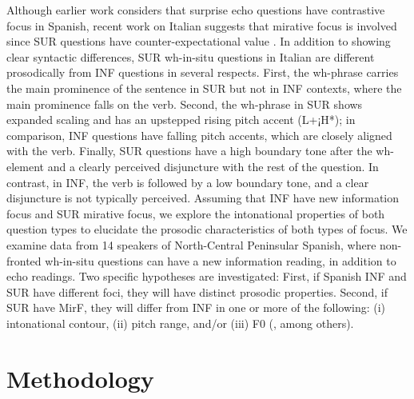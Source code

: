 \documentclass[output=paper,colorlinks,citecolor=brown,draftmode]{langscibook}
\begin{document}
\largerpage
Although earlier work considers that surprise echo questions have contrastive focus in Spanish, recent work on Italian suggests that mirative focus is involved since SUR questions have counter-expectational value \citep{BadanCrocco2019}. In addition to showing clear syntactic differences, SUR wh-in-situ questions in Italian are different prosodically from INF questions in several respects. First, the wh-phrase carries the main prominence of the sentence in SUR but not in INF contexts, where the main prominence falls on the verb. Second, the wh-phrase in SUR shows expanded scaling and has an upstepped rising pitch accent (L+¡H*); in comparison, INF questions have falling pitch accents, which are closely aligned with the verb. Finally, SUR questions have a high boundary tone after the wh-element and a clearly perceived disjuncture with the rest of the question. In contrast, in INF, the verb is followed by a low boundary tone, and a clear disjuncture is not typically perceived.
Assuming that INF have new information focus and SUR mirative focus, we explore the intonational properties of both question types to elucidate the prosodic characteristics of both types of focus. We examine data from 14 speakers of North-Central Peninsular Spanish, where non-fronted wh-in-situ questions can have a new information reading, in addition to echo readings. Two specific hypotheses are investigated: First, if Spanish INF and SUR have different foci, they will have distinct prosodic properties. Second, if SUR have MirF, they will differ from INF in one or more of the following: (i) intonational contour, (ii) pitch range, and/or (iii) F0 (\citealp{crocco2016,HuttenlauchFeldhausen2016,BadanFiori2017,machuca_ayusoyRios2017,BadanCrocco2019}, among others).

\section{Methodology}\label{sec:13:3}
\end{document}
